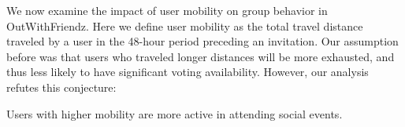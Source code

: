 \begin{comment}
\begin{observation}
Paid users have lower mobility than unpaid users.
\end{observation}
As described in previous sections, we have both paid and unpaid users in our dataset. The paid users are mainly from Microworkers and Craigslist while the unpaid users are mainly campus students. Figure~\ref{fig:paidmoves} shows the distribution of single movement distances between paid and unpaid users. The average distance is 4.19 miles for unpaid users and 5.57 miles for paid users. Figure~\ref{fig:paidtrips} shows the distribution of number of movements per day between paid and unpaid users. The average movement count for paid users is 4.11 and 6.07 for unpaid users. Both figures illustrates that our paid users will have lower mobility than unpaid users. We believe the most important factor for this is the age difference. Unpaid users are mostly students who are younger and more active in their life. In comparison, the age of paid users will be higher, which generate lower mobility.

\begin{figure}
\centering
\begin{subfigure}{0.5\textwidth}
  \centering
  \texttt{[image: paid\_movement\_length]}
  \caption{Single movement distance}
  \label{fig:paidmoves}
\end{subfigure}%
\begin{subfigure}{0.5\textwidth}
  \centering
  \texttt{[image: paid\_movement\_num\_length]}
  \caption{Number of movement per day}
  \label{fig:paidtrips}
\end{subfigure}
\caption{The distribution of single movement distance (left) and movements per day (right) between paid and unpaid users.}
\end{figure}

\end{comment}
We now examine the impact of user mobility on group behavior in OutWithFriendz. 
Here we define user mobility as the total travel distance traveled by a user in
the 48-hour period preceding an invitation. Our assumption before was that users
who traveled longer distances will be more exhausted, and thus less likely to
have significant voting availability. However, our analysis refutes this
conjecture:
\begin{observation}
Users with higher mobility are more active in attending social events.
\end{observation}
